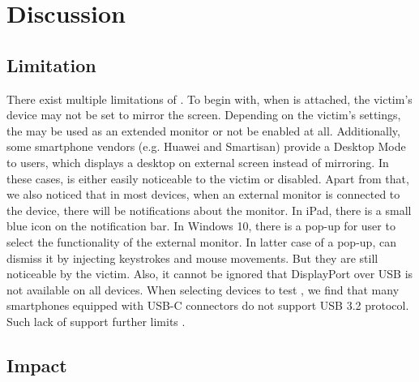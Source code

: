 \section{Discussion}
\label{sec:discussion}

\subsection{Limitation}
There exist multiple limitations of \tool. To begin with, when \tool is attached, the victim's device may not be set to mirror the screen. Depending on the victim's settings, the \tool may be used as an extended monitor or not be enabled at all. Additionally, some smartphone vendors (e.g. Huawei and Smartisan) provide a Desktop Mode to users, which displays a desktop on external screen instead of mirroring. In these cases, \tool is either easily noticeable to the victim or disabled.  Apart from that, we also noticed that in most devices, when an external monitor is connected to the device, there will be notifications about the monitor. In iPad, there is a small blue icon on the notification bar. In Windows 10, there is a pop-up for user to select the functionality of the external monitor. In latter case of a pop-up, \tool can dismiss it by injecting keystrokes and mouse movements. But they are still noticeable by the victim. Also, it cannot be ignored that DisplayPort over \ac{USB} is not available on all devices. When selecting devices to test \tool, we find that many smartphones equipped with USB-C connectors do not support \ac{USB} 3.2 protocol. Such lack of support further limits \tool.
\begin{comment}
There exist multiple limitations of \tool.  To begin with, \tool can only gain
the information and control access of the host itself instead of external
hardware.  Consequently, as we introduced in the
Section~\ref{sec:countermeasures}, \tool can hardly bypass the defense
approaches that use external hardware for authorization.  Moreover, most of
the devices will prompt users to give authentication to the \ac{USB} devices or
select one of the functional modes after they are plugged in.  Though some of
such prompts are not conspicuous for non-experts, especially when \tool is
concealed within other functional hardware such as power banks \shuqing{If
there is experiment, add it here.}, the probability of whether users could get
aware that something unusual happens will increase with the existence of these
prompting messages.
\end{comment}
\subsection{Impact}

